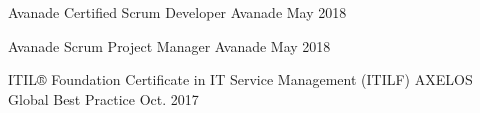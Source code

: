 \begin{cvhonors}
\cvhonor
    {Avanade Certified Scrum Developer} %
    {Avanade} %
    {} %
    {May 2018} %

\cvhonor
    {Avanade Scrum Project Manager} %
    {Avanade}
    {} %
    {May 2018} %

\cvhonor
    {ITIL® Foundation Certificate in IT Service Management (ITILF)}  %
    {AXELOS Global Best Practice}
    {} %
    {Oct. 2017} %
\end{cvhonors}
